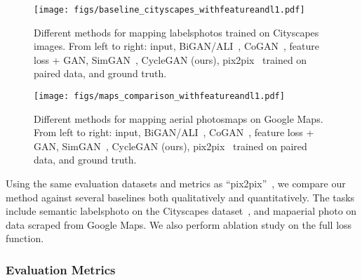 \documentclass[10pt,twocolumn,letterpaper]{article}
\newcommand{\lblfig}[1]{\label{fig:#1}}
\newcommand{\shortcite}[1]{\cite{#1}}
\begin{document}
\begin{figure*}[t]
\begin{center}
\texttt{[image: figs/baseline\_cityscapes\_withfeatureandl1.pdf]}
\end{center}
 \vspace{-4 mm}
 \caption{Different methods for mapping labelsphotos trained on Cityscapes images. From left to right: input, BiGAN/ALI~\cite{donahue2016adversarial,dumoulin2016adversarially}, CoGAN~\cite{liu2016coupled},  feature loss + GAN, SimGAN~\cite{shrivastava2016learning}, CycleGAN (ours), pix2pix~\cite{isola2016image} trained on paired data, and ground truth.}
  \vspace{-4 mm}
\lblfig{cityscapes_baseline}
\end{figure*}




\begin{figure*}[t]
\begin{center}
\texttt{[image: figs/maps\_comparison\_withfeatureandl1.pdf]} 
 \vspace{-4 mm}
\caption{Different methods for mapping aerial photosmaps on Google Maps. From left to right: input, BiGAN/ALI~\cite{donahue2016adversarial,dumoulin2016adversarially}, CoGAN~\cite{liu2016coupled},  feature loss + GAN, SimGAN~\cite{shrivastava2016learning}, CycleGAN (ours), pix2pix~\cite{isola2016image} trained on paired data, and ground truth.}
\lblfig{maps_baseline}
\end{center}
 \vspace{-8 mm}

\end{figure*} 


Using the same evaluation datasets and metrics as ``pix2pix''~\shortcite{isola2016image}, we compare our method against several baselines both qualitatively and quantitatively. The tasks include semantic labelsphoto on the Cityscapes dataset~\cite{Cordts2016Cityscapes}, and mapaerial photo on data scraped from Google Maps. We also perform ablation study on the full loss function.
	
\vspace{-1 mm}
\subsubsection{Evaluation Metrics}
\vspace{-1 mm}
\end{document}
